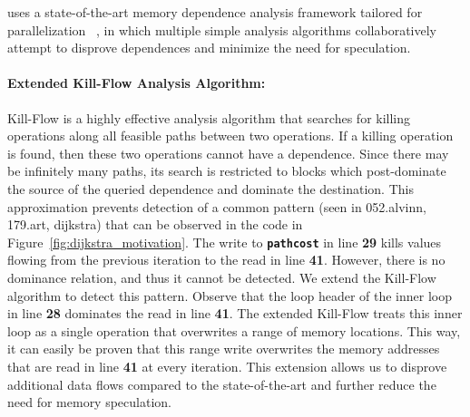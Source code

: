 \name uses a state-of-the-art memory dependence analysis framework
tailored for parallelization ~\cite{johnson:14:pldi}, in
which multiple simple analysis algorithms collaboratively attempt to
disprove dependences and minimize the need for speculation.
%

\paragraph{Extended Kill-Flow Analysis Algorithm:}
Kill-Flow is a highly effective analysis algorithm that searches for
killing operations along all feasible paths between two operations. If
a killing operation is found, then these two operations cannot have a
dependence.  Since  there  may  be  infinitely  many  paths,  its
search is restricted to blocks which post-dominate the source of the
queried dependence and dominate the destination.
%
This approximation prevents detection of a common pattern (seen in
052.alvinn, 179.art, dijkstra) that can be observed in the code in
Figure~\ref{fig:dijkstra_motivation}.
%
The write to \texttt{\textbf{pathcost}} in line \textbf{29} kills
values flowing from the previous iteration to the read in line \textbf{41}.
However, there is no dominance
relation, and thus it cannot be detected.
%
We extend the Kill-Flow algorithm to detect this pattern. Observe that
the loop header of the inner loop in line \textbf{28} dominates the
read in line \textbf{41}. The extended Kill-Flow treats this inner loop as a single
operation that overwrites a range of memory locations. This way, it
can easily be proven that this range write overwrites
the memory addresses that are read in line \textbf{41} at every iteration.
%
%
This extension allows us to disprove additional data flows compared to
the state-of-the-art and further reduce the need for memory
speculation.

